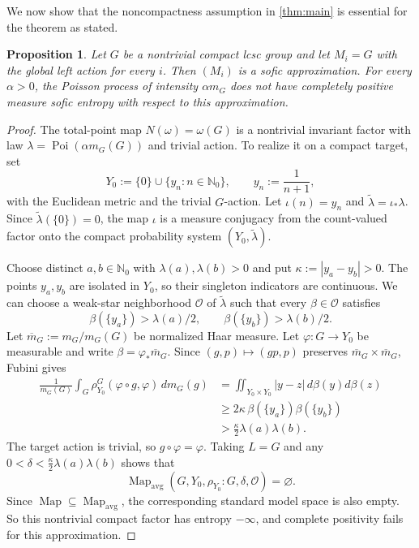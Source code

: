 \documentclass[12pt]{amsart}
\newtheorem{proposition}[proposition]{Proposition}
\theoremstyle{definition}
\newcommand{\Haar}{m_G}
\newcommand{\Map}{\operatorname{Map}}
\newcommand{\Mapavg}{\operatorname{Map}_{\mathrm{avg}}}
\newcommand{\cO}{\mathcal O}
\newcommand{\1}{\mathbf 1}
\begin{document}
We now show that the noncompactness assumption in \cref{thm:main} is essential for the theorem as stated.

\begin{proposition}\label{prop:compact-obstruction}
Let $G$ be a nontrivial compact lcsc group and let $M_i=G$ with the global left action for every $i$. Then $(M_i)$ is a sofic approximation. For every $\alpha>0$, the Poisson process of intensity $\alpha\Haar$ does not have completely positive measure sofic entropy with respect to this approximation.
\end{proposition}

\begin{proof}
The total-point map
$
 N(\omega)=\omega(G)
$
is a nontrivial invariant factor with law $\lambda=\operatorname{Poi}(\alpha\Haar(G))$ and trivial action. To realize it on a compact target, set
\[
 Y_0:=\{0\}\cup\{y_n:n\in\mathbb N_0\},
 \qquad y_n:=\frac1{n+1},
\]
with the Euclidean metric and the trivial $G$-action. Let $\iota(n)=y_n$ and $\widetilde\lambda=\iota_*\lambda$. Since $\widetilde\lambda(\{0\})=0$, the map $\iota$ is a measure conjugacy from the count-valued factor onto the compact probability system $(Y_0,\widetilde\lambda)$.

Choose distinct $a,b\in\mathbb N_0$ with $\lambda(a),\lambda(b)>0$ and put
$
 \kappa:=|y_a-y_b|>0.
$
The points $y_a,y_b$ are isolated in $Y_0$, so their singleton indicators are continuous. We can choose a weak-star neighborhood $\cO$ of $\widetilde\lambda$ such that every $\beta\in\cO$ satisfies
\[
 \beta(\{y_a\})>\lambda(a)/2,
 \qquad
 \beta(\{y_b\})>\lambda(b)/2.
\]
Let $\overline\Haar:=\Haar/\Haar(G)$ be normalized Haar measure. Let $\varphi:G\to Y_0$ be measurable and write $\beta=\varphi_*\overline\Haar$. Since $(g,p)\mapsto(gp,p)$ preserves $\overline\Haar\times\overline\Haar$, Fubini gives
\begin{align*}
 \frac1{\Haar(G)}\int_G\rho_{Y_0}^{G}(\varphi\circ g,\varphi)\,d\Haar(g)
 &=\iint_{Y_0\times Y_0}|y-z|\,d\beta(y)d\beta(z)\\
 &\geq2\kappa\,\beta(\{y_a\})\beta(\{y_b\})\\
 &>\frac\kappa2\lambda(a)\lambda(b).
\end{align*}
The target action is trivial, so $g\circ\varphi=\varphi$. Taking $L=G$ and any
$
 0<\delta<\frac\kappa2\lambda(a)\lambda(b)
$
shows that
\[
 \Mapavg(G,Y_0,\rho_{Y_0}:G,\delta,\cO)=\varnothing.
\]
Since $\Map\subseteq\Mapavg$, the corresponding standard model space is also empty. So this nontrivial compact factor has entropy $-\infty$, and complete positivity fails for this approximation.
\end{proof}
\end{document}
